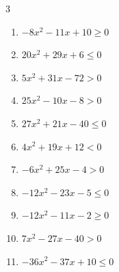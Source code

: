


\setcounter{quesnum}{30}

\begin{multicols}{3}
\begin{enumerate}
  \itemsep=30pt
  \item $-8x^{2}-11x+10\geq 0$


  \item $20x^{2}+29x+6\leq 0$


  \item $5x^{2}+31x-72>0$


  \item $25x^{2}-10x-8>0$


  \item $27x^{2}+21x-40\leq 0$


  \item $4x^{2}+19x+12<0$


  \item $-6x^{2}+25x-4>0$


  \item $-12x^{2}-23x-5\leq 0$


  \item $-12x^{2}-11x-2\geq 0$


  \item $7x^{2}-27x-40>0$


\columnbreak %

  \item $-36x^{2}-37x+10\leq 0$


\end{enumerate}
\end{multicols}
